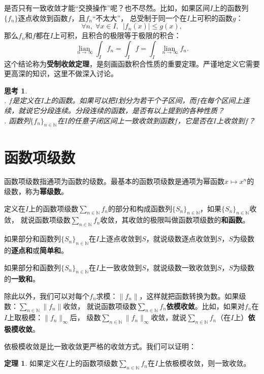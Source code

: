 \documentclass[12pt,UTF8]{ctexbook}
\newcommand{\lian}[1]{
    \underset{#1}{\operatorname{lian}\,}
}
\theoremstyle{definition}
\newtheorem{tm}{定理}[section]
\theoremstyle{plain}
\newtheorem{sk}{思考}[section]
\begin{document}
\begin{appendix}
是否只有一致收敛才能“交换操作”呢？也不尽然。比如，如果区间$I$上的函数列$\{f_n\}$逐点收敛到函数$f$，且$f_n$“不太大”，
总受制于同一个在$I$上可积的函数$g$：
$$ \forall n, \; \forall x \in I,\,\,\, |f_n(x)| \leqslant g(x), $$
那么$f_n$和$f$都在$I$上可积，且积合的极限等于极限的积合：
$$ \lian{n\to\infty} \int_I f_n = \int_I f = \int_I \lian{n\to\infty} f_n. $$
这个结论称为\textbf{受制收敛定理}，是刻画函数积合性质的重要定理。严谨地定义它需要更高深的知识，这里不做深入讨论。

\begin{sk}
    \mbox{} \\
    . $f$是定义在$I$上的函数。如果可以把$I$划分为若干个子区间，而$f$在每个区间上连续，就说它分段连续。分段连续的函数，是否有以上提到的各种性质？\\
    . 函数列$\{f_n\}_{n\in\mathbb{N}}$在$I$的任意子闭区间上一致收敛到函数$f$，它是否在$I$上收敛到$f$？
\end{sk}

\section{函数项级数}

函数项级数指通项为函数的级数。最基本的函数项级数是通项为幂函数$x\mapsto x^n$的级数，称为\textbf{幂级数}。

定义在$I$上的函数项级数$\sum_{n\in\mathbb{N}} f_n$的部分和构成函数列$\{S_n\}_{n\in\mathbb{N}}$，如果$\{S_n\}_{n\in\mathbb{N}}$收敛，
就说函数项级数$\sum_{n\in\mathbb{N}} f_n$收敛，其收敛的极限叫做函数项级数的\textbf{和函数}。

如果部分和函数列$\{S_n\}_{n\in\mathbb{N}}$在$I$上逐点收敛到$S$，就说级数逐点收敛到$S$，$S$为级数的\textbf{逐点和}或\textbf{简单和}。

如果部分和函数列$\{S_n\}_{n\in\mathbb{N}}$在$I$上一致收敛到$S$，就说级数一致收敛到$S$，$S$为级数的\textbf{一致和}。

除此以外，我们可以对每个$f_n$求模：$\|f_n\|$，这样就把函数转换为数。如果级数：$\sum_{n\in\mathbb{N}} \|f_n\|$收敛，
就说函数项级数$\sum_{n\in\mathbb{N}} f_n$\textbf{依模收敛}。比如，如果对$f_n$在$I$上取极模：$\|f_n\|_{\infty}$后，
级数$\sum_{n\in\mathbb{N}} \|f_n\|_{\infty}$收敛，就说$\sum_{n\in\mathbb{N}} f_n$（在$I$上）\textbf{依极模收敛}。

依极模收敛是比一致收敛更严格的收敛方式。我们可以证明：
\begin{tm}
    如果定义在$I$上的函数项级数$\sum_{n\in\mathbb{N}} f_n$在$I$上依极模收敛，则一致收敛。
\end{tm}


\end{appendix}
\end{document}
